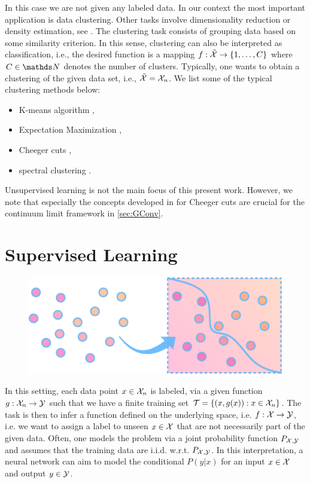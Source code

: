 In this case we are not given any labeled data. In our context the most important application is data clustering. Other tasks involve dimensionality reduction or density estimation, see \cite{subramanya2014graph}. The clustering task consists of grouping data based on some similarity criterion. In this sense, clustering can also be interpreted as classification, i.e., the desired function is a mapping $f:\tilde{\mathcal{X}}\to \{1,\ldots, C\}$ where $C\in\N$ denotes the number of clusters. Typically, one wants to obtain a clustering of the given data set, i.e., $\tilde{\mathcal{X}} = \mathcal{X}_n$. We list some of the typical clustering methods below:
%
\begin{itemize}
\item K-means algorithm \cite{steinhaus1956division},
\item Expectation Maximization  \cite{dempster1977maximum},
\item Cheeger cuts \cite{GarcSlep15, szlam2009total, trillos2016consistency, garcia2022graph},
\item spectral clustering \cite{trillos2018variational}.
\end{itemize}
%
%
Unsupervised learning is not the main focus of this present work. However, we note that especially the concepts developed in \cite{GarcSlep15} for Cheeger cuts are crucial for the continuum limit framework in \cref{sec:GConv}.

\section{Supervised Learning}\label{sec:PSL}
\begin{figure}
\centering
\includegraphics[width=.5\textwidth]{atelier/paradigms/SL.pdf}
\end{figure}
%
In this setting, each data point $x\in\mathcal{X}_n$ is labeled, via a given function $g:\mathcal{X}_n\to\mathcal{\mathcal{Y}}$ such that we have a finite training set $\mathcal{T} = \{(x,g(x)): x\in\mathcal{X}_n\}$. The task is then to infer a function defined on the underlying space, i.e. $f:\mathcal{X} \to\mathcal{\mathcal{Y}}$, i.e. we want to assign a label to unseen $x\in\mathcal{X}$ that are not necessarily part of the given data. Often, one models the problem via a joint probability function $P_{\mathcal{X},\mathcal{\mathcal{Y}}}$ and assumes that the training data are i.i.d. w.r.t. $P_{\mathcal{X},\mathcal{\mathcal{Y}}}$. In this interpretation, a neural network can aim to model the conditional $P(y|x)$ for an input $x\in\mathcal{X}$ and output $y\in\mathcal{\mathcal{Y}}$.


